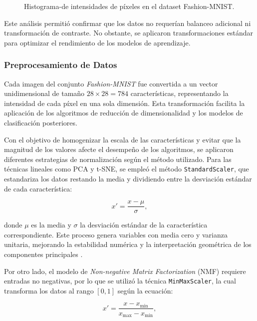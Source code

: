 \documentclass[conference]{IEEEtran}
\begin{document}
\begin{figure}[H]
    \centering
    
    \caption{Histograma-de intensidades de píxeles en el dataset Fashion-MNIST.}
    \label{fig:histograma_intensidades_promedio}
\end{figure}



Este análisis permitió confirmar que los datos no requerían balanceo adicional ni transformación de contraste. No obstante, se aplicaron transformaciones estándar para optimizar el rendimiento de los modelos de aprendizaje.


\subsubsection{Preprocesamiento de Datos}

Cada imagen del conjunto \textit{Fashion-MNIST} fue convertida a un vector unidimensional de tamaño $28 \times 28 = 784$ características, representando la intensidad de cada píxel en una sola dimensión. Esta transformación facilita la aplicación de los algoritmos de reducción de dimensionalidad y los modelos de clasificación posteriores.

Con el objetivo de homogenizar la escala de las características y evitar que la magnitud de los valores afecte el desempeño de los algoritmos, se aplicaron diferentes estrategias de normalización según el método utilizado. Para las técnicas lineales como PCA y t-SNE, se empleó el método \texttt{StandardScaler}, que estandariza los datos restando la media y dividiendo entre la desviación estándar de cada característica:

\begin{equation}
x' = \frac{x - \mu}{\sigma},
\label{eq:standardization}
\end{equation}

donde $\mu$ es la media y $\sigma$ la desviación estándar de la característica correspondiente. Este proceso genera variables con media cero y varianza unitaria, mejorando la estabilidad numérica y la interpretación geométrica de los componentes principales \cite{jolliffe2016principal}.

Por otro lado, el modelo de \textit{Non-negative Matrix Factorization} (NMF) requiere entradas no negativas, por lo que se utilizó la técnica \texttt{MinMaxScaler}, la cual transforma los datos al rango $[0,1]$ según la ecuación:

\begin{equation}
x' = \frac{x - x_{\min}}{x_{\max} - x_{\min}},
\label{eq:minmax_scaling}
\end{equation}
\end{document}
